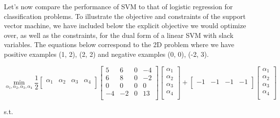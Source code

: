 \documentclass[10pt]{article}
\begin{document}
Let's now compare the performance of SVM to that of logistic regression for classification problems. To illustrate the objective and constraints of the support vector machine, we have included below the explicit objective we would optimize over, as well as the constraints, for the dual form of a linear SVM with slack variables. The equations below correspond to the 2D problem where we have positive examples (1, 2), (2, 2) and negative examples (0, 0), (-2, 3).

\[
\min_{\alpha_1, \alpha_2, \alpha_3, \alpha_4}
\frac{1}{2}
\begin{bmatrix}
    \alpha_1 & \alpha_2 & \alpha_3 & \alpha_4 \\
\end{bmatrix}
\begin{bmatrix}
    5       & 6 & 0 & -4 \\
    6       & 8 & 0 & -2 \\
    0       & 0 & 0 & 0 \\
    -4       & -2 & 0 & 13 \\
\end{bmatrix}
\begin{bmatrix}
    \alpha_1 \\
    \alpha_2 \\
    \alpha_3 \\
    \alpha_4 \\
\end{bmatrix} 
+
\begin{bmatrix}
    -1       & -1 & -1 & -1 \\
\end{bmatrix}
\begin{bmatrix}
    \alpha_1 \\
    \alpha_2 \\
    \alpha_3 \\
    \alpha_4 \\
\end{bmatrix} 
\]

\begin{center}
s.t.
\end{center}
\end{document}
